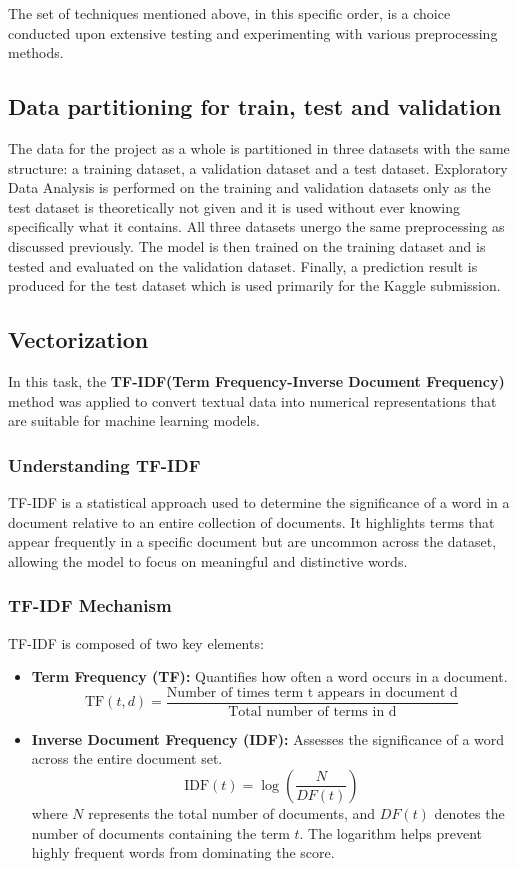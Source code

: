 \documentclass[12pt]{fphw}
\begin{document}
The set of techniques mentioned above, in this specific order, is a choice conducted upon extensive testing and experimenting with various preprocessing methods.\pagebreak

\subsection{Data partitioning for train, test and validation}
The data for the project as a whole is partitioned in three datasets with the same structure: a training dataset, a validation dataset and a test dataset. Exploratory Data Analysis is performed on the training and validation datasets only as the test dataset is theoretically not given and it is used without ever knowing specifically what it contains. All three datasets unergo the same preprocessing as discussed previously. The model is then trained on the training dataset and is tested and evaluated on the validation dataset. Finally, a prediction result is produced for the test dataset which is used primarily for the Kaggle submission.

\subsection{Vectorization}

In this task, the \textbf{TF-IDF(Term Frequency-Inverse Document Frequency)} method was applied to convert textual data into numerical representations that are suitable for machine learning models.

\subsubsection{Understanding TF-IDF}

TF-IDF is a statistical approach used to determine the significance of a word in a document relative to an entire collection of documents. It highlights terms that appear frequently in a specific document but are uncommon across the dataset, allowing the model to focus on meaningful and distinctive words.

\subsubsection{TF-IDF Mechanism}

TF-IDF is composed of two key elements:

\begin{itemize}
    \item \textbf{Term Frequency (TF):} Quantifies how often a word occurs in a document.
    \[
    \text{TF}(t, d) = \frac{\text{Number of times term t appears in document d}}{\text{Total number of terms in d}}
    \]
    \item \textbf{Inverse Document Frequency (IDF):} Assesses the significance of a word across the entire document set.
    \[
    \text{IDF}(t) = \log \left( \frac{N}{DF(t)} \right)
    \]
    where $N$ represents the total number of documents, and $DF(t)$ denotes the number of documents containing the term $t$. The logarithm helps prevent highly frequent words from dominating the score.
\end{itemize}
\end{document}
